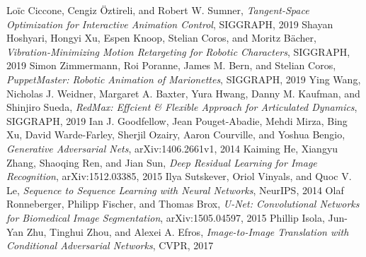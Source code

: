 \documentclass[logo,reportComp]{thesis}
\begin{document}
\begin{thebibliography}{99}
 Lo\"ic Ciccone, Cengiz Öztireli, and Robert W. Sumner, \emph{Tangent-Space Optimization for Interactive Animation Control}, SIGGRAPH, 2019
 Shayan Hoshyari, Hongyi Xu, Espen Knoop, Stelian Coros, and Moritz
B\"acher, \emph{Vibration-Minimizing Motion Retargeting for Robotic Characters}, SIGGRAPH, 2019
 Simon Zimmermann, Roi Poranne, James M. Bern, and Stelian Coros, \emph{PuppetMaster: Robotic Animation of Marionettes}, SIGGRAPH, 2019
 Ying Wang, Nicholas J. Weidner, Margaret A. Baxter, Yura Hwang, Danny M. Kaufman, and Shinjiro Sueda, \emph{RedMax: Effcient \& Flexible Approach for Articulated Dynamics}, SIGGRAPH, 2019
 Ian J. Goodfellow, Jean Pouget-Abadie, Mehdi Mirza, Bing Xu, David Warde-Farley, Sherjil Ozairy, Aaron Courville, and Yoshua Bengio, \emph{Generative Adversarial Nets}, arXiv:1406.2661v1, 2014
 Kaiming He, Xiangyu Zhang, Shaoqing Ren, and Jian Sun, \emph{Deep Residual Learning for Image Recognition}, arXiv:1512.03385, 2015
 Ilya Sutskever, Oriol Vinyals, and Quoc V. Le, \emph{Sequence to Sequence Learning with Neural Networks}, NeurIPS, 2014
 Olaf Ronneberger, Philipp Fischer, and Thomas Brox, \emph{U-Net: Convolutional Networks for Biomedical Image Segmentation}, arXiv:1505.04597, 2015
 Phillip Isola, Jun-Yan Zhu, Tinghui Zhou, and Alexei A. Efros, \emph{Image-to-Image Translation with Conditional Adversarial Networks}, CVPR, 2017
\end{thebibliography}

\end{document}
